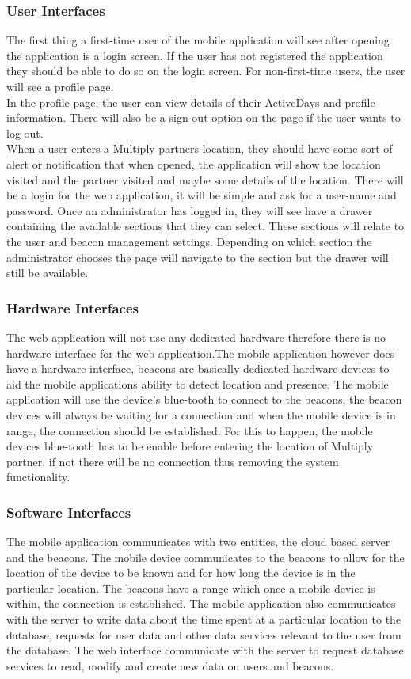 \documentclass[11pt]{article}
\begin{document}
\subsubsection{User Interfaces}
The first thing a first-time user of the mobile application will see after opening the application is a login screen. If the user has not registered the application they should be able to do so on the login screen. For non-first-time users, the user will see a profile page.\\
In the profile page, the user can view details of their ActiveDays and profile information. There will also be a sign-out option on the page if the user wants to log out.\\
When a user enters a Multiply partners location, they should have some sort of alert or notification that when opened, the application will show the location visited and the partner visited and maybe some details of the location.
There will be a login for the web application, it will be simple and ask for a user-name and password. Once an administrator has logged in, they will see have a drawer containing the available sections that they can select. These sections will relate to the user and beacon management settings. Depending on which section the administrator chooses the page will navigate to the section but the drawer will still be available.
\subsubsection{Hardware Interfaces}
The web application will not use any dedicated hardware therefore there is no hardware interface for the web application.The mobile application however does have a hardware interface, beacons are basically dedicated hardware devices to aid the mobile applications ability to detect location and presence. The mobile application will use the device's blue-tooth to connect to the beacons, the beacon devices will always be waiting for a connection and when the mobile device is in range, the connection should be established. For this to happen, the mobile devices blue-tooth has to be enable before entering the location of  Multiply partner, if not there will be no connection thus removing the system functionality.
\subsubsection{Software Interfaces}
The mobile application communicates with two entities, the cloud based server and the beacons. The mobile device communicates to the beacons to allow for the location of the device to be known and for how long the device is in the particular location. The beacons have a range which once a mobile device is within, the connection is established. The mobile application also communicates with the server to write data about the time spent at a particular location to the database, requests for user data and other data services relevant to the user from the database.
The web interface communicate with the server to request database services to read, modify and create new data on users and beacons. 
\end{document}
